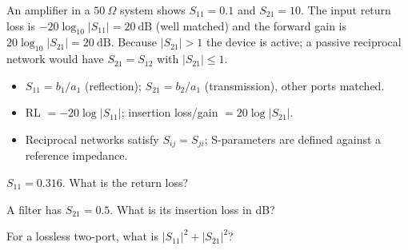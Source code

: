 \begin{workedexample}
An amplifier in a $50\ \Omega$ system shows $S_{11} = 0.1$ and
$S_{21} = 10$. The input return loss is $-20\log_{10}|S_{11}| = 20\ \text{dB}$
(well matched) and the forward gain is $20\log_{10}|S_{21}| = 20\ \text{dB}$.
Because $|S_{21}| > 1$ the device is active; a passive reciprocal network would
have $S_{21} = S_{12}$ with $|S_{21}| \le 1$.
\end{workedexample}

\begin{keytakeaways}
\begin{itemize}[leftmargin=1.4em,itemsep=2pt]
\item $S_{11} = b_1/a_1$ (reflection); $S_{21} = b_2/a_1$ (transmission), other ports matched.
\item RL $= -20\log|S_{11}|$; insertion loss/gain $= 20\log|S_{21}|$.
\item Reciprocal networks satisfy $S_{ij} = S_{ji}$; S-parameters are defined against a reference impedance.
\end{itemize}
\end{keytakeaways}

\begin{exercises}
\item $S_{11} = 0.316$. What is the return loss?
\item A filter has $S_{21} = 0.5$. What is its insertion loss in dB?
\item For a lossless two-port, what is $|S_{11}|^2 + |S_{21}|^2$?
\end{exercises}

